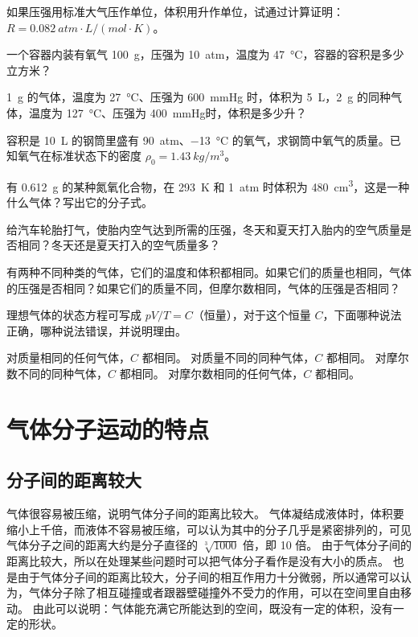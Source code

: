 \begin{Practice}
\begin{question}
	\item 如果压强用标准大气压作单位，体积用升作单位，试通过计算证明：$R=\qty{0.082}{atm\cdot L/(mol\cdot K)}$。
	\item 一个容器内装有氧气 \qty{100}{g}，压强为 \qty{10}{atm}，温度为 \qty{47}{\celsius}，容器的容积是多少立方米？
	\item \qty{1}{g} 的气体，温度为 \qty{27}{\celsius}、压强为 \qty{600}{mmHg} 时，体积为 \qty{5}{L}，\qty{2}{g} 的同种气体，温度为 \qty{127}{\celsius}、压强为 \qty{400}{mmHg}时，体积是多少升？
	\item 容积是 \qty{10}{L} 的钢筒里盛有 \qty{90}{atm}、\qty{-13}{\celsius} 的氧气，求钢筒中氧气的质量。已知氧气在标准状态下的密度 $\rho_0=\qty{1.43}{kg/m^3}$。
	\item 有 \qty{0.612}{g} 的某种氮氧化合物，在 \qty{293}{K} 和 \qty{1}{atm} 时体积为 \qty{480}{cm^3}，这是一种什么气体？写出它的分子式。
	\item 给汽车轮胎打气，使胎内空气达到所需的压强，冬天和夏天打入胎内的空气质量是否相同？冬天还是夏天打入的空气质量多？
	\item 有两种不同种类的气体，它们的温度和体积都相同。如果它们的质量也相同，气体的压强是否相同？如果它们的质量不同，但摩尔数相同，气体的压强是否相同？
	\item 理想气体的状态方程可写成 $pV/T=C$（恒量），对于这个恒量 $C$，下面哪种说法正确，哪种说法错误，并说明理由。
	\begin{tasks}
		\task 对质量相同的任何气体，$C$ 都相同。
		\task 对质量不同的同种气体，$C$ 都相同。	
		\task 对摩尔数不同的同种气体，$C$ 都相同。
		\task 对摩尔数相同的任何气体，$C$ 都相同。
	\end{tasks}
\end{question}
\end{Practice}

\section{气体分子运动的特点}\label{sec:characteristics_gas_molecules}
\subsection{分子间的距离较大} 
气体很容易被压缩，说明气体分子间的距离比较大。
气体凝结成液体时，体积要缩小上千倍，而液体不容易被压缩，可以认为其中的分子几乎是紧密排列的，可见气体分子之间的距离大约是分子直径的 $\sqrt[3]{1000}$ 倍，即 10 倍。
由于气体分子间的距离比较大，所以在处理某些问题时可以把气体分子看作是没有大小的质点。
也是由于气体分子间的距离比较大，分子间的相互作用力十分微弱，所以通常可以认为，气体分子除了相互碰撞或者跟器壁碰撞外不受力的作用，可以在空间里自由移动。
由此可以说明：气体能充满它所能达到的空间，既没有一定的体积，没有一定的形状。

